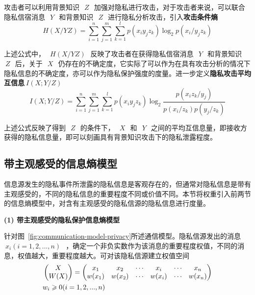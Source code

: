 攻击者可以利用背景知识~$~Z~$~加强对隐私进行攻击，对于攻击者来说，可以联合隐私信宿消息~$~Y~$~和背景知识~$~Z~$~进行隐私分析攻击，引入\textbf{攻击条件熵}
\begin{equation}
H(X/YZ)=\sum_{i=1}^{n}\sum_{j=1}^{m}\sum_{k=1}^{l}p(x_{i}y_{j}z_{k})\log_{2}p(x_{i}/y_{j}z_{k})
\end{equation}

上述公式中，~$~H(X/YZ)~$~反映了攻击者在获得隐私信宿消息~$~Y~$~和背景知识~$~Z~$~后，关于~$~X~$~仍存在的不确定度，它实际了可以作为在具有攻击分析的情况下隐私信息的不确定度，亦可以作为隐私保护强度的度量。进一步定义\textbf{隐私攻击平均互信息}$~I(X;Y/Z)~$~
\begin{equation}
I(X;Y/Z)=\sum_{i=1}^{n}\sum_{j=1}^{m}\sum_{k=1}^{l}p(x_{i}y_{j}z_{k})\log_{2}\frac{p(x_{i}z_{k}/y_{j})}{p(x_{i}/z_{k})p(y_{j}/z_{k})}
\end{equation}

上述公式反映了得到~$~Z~$~的条件下，~$~X~$~和~$~Y~$~之间的平均互信息量，即接收方获得的隐私信息量，即可以刻画具有背景知识攻击下的隐私泄露程度。

\subsection{带主观感受的信息熵模型}

信息源发生的隐私事件所泄露的隐私信息是客观存在的，但通常对隐私信息是带有主观感受的，不同的隐私信息的重要程度不同或价值不同。本节将权重引入前两节的信息熵模型中，对含有主观感受的隐私信源的隐私信息进行度量。

\textbf{(1) 带主观感受的隐私保护信息熵模型}

针对图~\ref{fig:communication-model-privacy}所述通信模型。隐私信源发出的消息~$~x_{i}(i=1,2,...,n)~$~，确定一个非负实数作为该消息的重要程度权值，不同的消息，权值越大，重要程度越大。可对该隐私信源建立权值空间
\begin{equation}
\centering
\begin{split}
&\begin{pmatrix}
X\\ 
W(X)
\end{pmatrix}=\begin{pmatrix}
x_{1} & x_{2} & \cdots  & x_{i} & \cdots  & x_{n}\\ 
w(x_{1})& w(x_{2}) & \cdots & w(x_{i}) & \cdots & w(x_{n})
\end{pmatrix} \\
&w_{i}\geqslant 0(i=1,2,...,n)
\end{split}
\end{equation}

